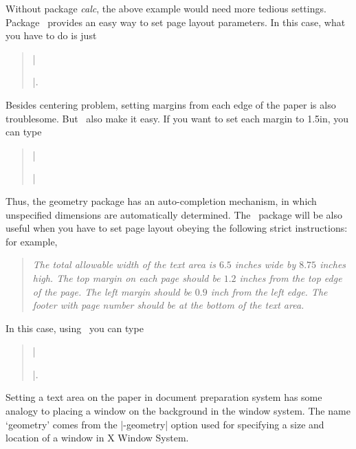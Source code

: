  Without package \textsl{calc}, the above example would need
 more tedious settings. Package \Gm\ provides an easy
 way to set page layout parameters. In this case, what you have to do
 is just
 \begin{quote}
    |\usepackage[text={7in,10in},centering]{geometry}|. 
 \end{quote}
 Besides centering problem, setting margins from each edge of the paper is
 also troublesome. But \Gm\ also make it easy.
 If you want to set each margin to 1.5in, you can type
 \begin{quote}
    |\usepackage[margin=1.5in]{geometry}| 
 \end{quote}
 Thus, the geometry package has an auto-completion mechanism, in which
 unspecified dimensions are automatically determined.
 The \Gm\ package will be also useful when you have to set page layout
 obeying the following strict instructions: for example,
 \begin{quote}\slshape
   The total allowable width of the text area is $6.5$ inches wide by $8.75$
   inches high. The top margin on each page should be $1.2$ inches from
   the top edge of the page. The left margin should be $0.9$ inch from 
   the left edge. The footer with page number should be at the bottom
   of the text area.
 \end{quote}
 In this case, using \Gm\ you can type
 \begin{quote}
 |\usepackage[total={6.5in,8.75in},|\\
 |            top=1.2in, left=0.9in, includefoot]{geometry}|.
 \end{quote}

 Setting a text area on the paper in document preparation system has some
 analogy to placing a window on the background in the window system. 
 The name `geometry' comes from the |-geometry| option used for specifying
 a size and location of a window in X Window System.
